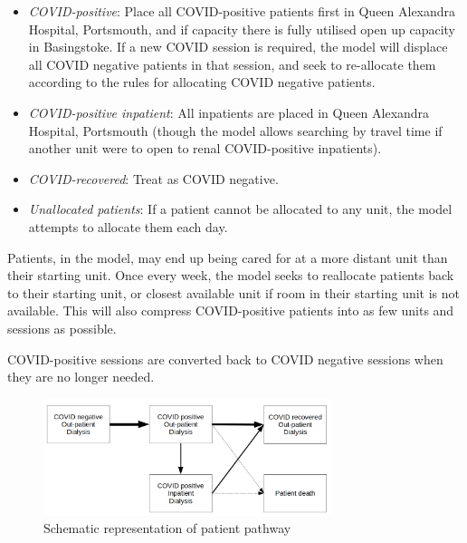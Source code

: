 \begin{multicols}{2}
\begin{itemize}
\item \emph{COVID-positive}: Place all COVID-positive patients first in Queen Alexandra Hospital, Portsmouth, and if capacity there is fully utilised open up capacity in Basingstoke. If a new COVID session is required, the model will displace all COVID negative patients in that session, and seek to re-allocate them according to the rules for allocating COVID negative patients.

\item \emph{COVID-positive inpatient}: All inpatients are placed in Queen Alexandra Hospital, Portsmouth (though the model allows searching by travel time if another unit were to open to renal COVID-positive inpatients). 

\item \emph{COVID-recovered}: Treat as COVID negative.

\item \emph{Unallocated patients}: If a patient cannot be allocated to any unit, the model attempts to allocate them each day.
\end{itemize}

Patients, in the model, may end up being cared for at a more distant unit than their starting unit. Once every week, the model seeks to reallocate patients back to their starting unit, or closest available unit if room in their starting unit is not available. This will also compress COVID-positive patients into as few units and sessions as possible.

COVID-positive sessions are converted back to COVID negative sessions when they are no longer needed.

\end{multicols}

\begin{figure}
\centering
\includegraphics[width=0.75\textwidth]{image/patient_pathway.png}
\caption{Schematic representation of patient pathway}
\label{fig:patient_pathway}
\end{figure}

